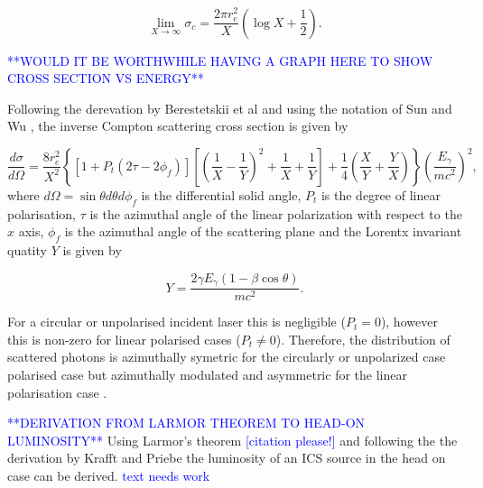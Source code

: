 \documentclass[../main.tex]{subfiles}
\begin{document}
\begin{equation}
\lim_{X \to \infty} \sigma_{c} = \frac{2\pi r_{e}^{2}}{X}\left(\log{X}+\frac{1}{2}\right).
\label{eq:compton_cross_section_ultrarelativistic_limit}
\end{equation}

\textcolor{blue}{**WOULD IT BE WORTHWHILE HAVING A GRAPH HERE TO SHOW CROSS SECTION VS ENERGY**}

Following the derevation by Berestetskii et al \cite{landau1982course} and using the notation of Sun and Wu \cite{sun2011theoretical}, the inverse Compton scattering cross section is given by

\begin{equation}
\frac{d\sigma}{d\Omega} = \frac{8r_{e}^{2}}{X^{2}}\left\{\left[1+P_{t}\left(2\tau-2\phi_{f}\right)\right]\left[\left(\frac{1}{X}-\frac{1}{Y}\right)^{2}+\frac{1}{X}+\frac{1}{Y}\right]+\frac{1}{4}\left(\frac{X}{Y}+\frac{Y}{X}\right)\right\}\left(\frac{E_{\gamma}}{mc^{2}}\right)^{2},    
\end{equation}
where $d\Omega = \sin\theta d\theta d\phi_{f}$ is the differential solid angle, $P_{t}$ is the degree of linear polarisation, $\tau$ is the azimuthal angle of the linear polarization with respect to the $x$ axis, $\phi_{f}$ is the azimuthal angle of the scattering plane and the Lorentx invariant quatity $Y$ is given by

\begin{equation}
Y = \frac{2\gamma E_{\gamma}\left(1-\beta\cos\theta\right)}{mc^{2}}.
\label{eq:cross_section_Y}    
\end{equation}

For a circular or unpolarised incident laser this is negligible ($P_{t}=0$), however this is non-zero for linear polarised cases ($P_{t}\neq0$). Therefore, the distribution of scattered photons is azimuthally symetric for the circularly or unpolarized case polarised case but azimuthally modulated and asymmetric for the linear polarisation case \cite{sun2011theoretical}.  


\textcolor{blue}{**DERIVATION FROM LARMOR THEOREM TO HEAD-ON LUMINOSITY**}
Using Larmor's theorem \textcolor{blue}{[citation please!]} and following the the derivation by Krafft and Priebe \cite{krafft2010compton} the luminosity of an ICS source in the head on case can be derived. \textcolor{blue}{text needs work}
\end{document}
